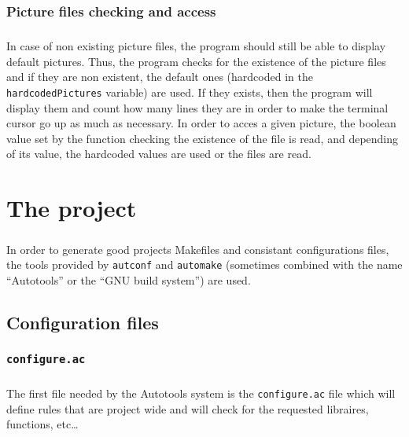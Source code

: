 \documentclass{report}
\begin{document}
\subsection{Picture files checking and access}

\paragraph{} In case of non existing picture files, the program should still be
able to display default pictures. Thus, the program checks for the existence of
the picture files and if they are non existent, the default ones (hardcoded in
the \texttt{hardcodedPictures} variable) are used. If they exists, then the
program will display them and count how many lines they are in order to make
the terminal cursor go up as much as necessary. In order to acces a given
picture, the boolean value set by the function checking the existence of the
file is read, and depending of its value, the hardcoded values are used or the
files are read.

\chapter{The project}

\paragraph{} In order to generate good projects Makefiles and consistant
configurations files, the tools provided by \texttt{autconf} and
\texttt{automake} (sometimes combined with the name ``Autotools'' or the ``GNU
build system'') are used.

\section{Configuration files}

\subsection{\texttt{configure.ac}}

\paragraph{} The first file needed by the Autotools system is the
\texttt{configure.ac} file which will define rules that are project wide and
will check for the requested libraires, functions, etc\dots
\end{document}
